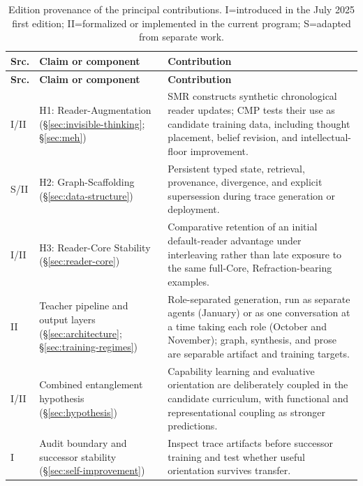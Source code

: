 \documentclass[11pt]{article}
\begin{document}
\begingroup
\small
\setlength{\tabcolsep}{3pt}
\begin{longtable}{
  >{\raggedright\arraybackslash}p{0.85cm}
  >{\raggedright\arraybackslash}p{4.2cm}
  >{\raggedright\arraybackslash}p{8.45cm}}
\caption{Edition provenance of the principal contributions. \textsc{I}=introduced in the July 2025 first edition; \textsc{II}=formalized or implemented in the current program; \textsc{S}=adapted from separate work.}
\label{tab:claim-status}\\
\toprule
\textbf{Src.} & \textbf{Claim or component} & \textbf{Contribution} \\
\midrule
\endfirsthead
\toprule
\textbf{Src.} & \textbf{Claim or component} & \textbf{Contribution} \\
\midrule
\endhead
\bottomrule
\endlastfoot
\textsc{I/II} & H1: Reader-Augmentation (\S\ref{sec:invisible-thinking}; \S\ref{sec:meh}) & SMR constructs synthetic chronological reader updates; CMP tests their use as candidate training data, including thought placement, belief revision, and intellectual-floor improvement. \\
\textsc{S/II} & H2: Graph-Scaffolding (\S\ref{sec:data-structure}) & Persistent typed state, retrieval, provenance, divergence, and explicit supersession during trace generation or deployment. \\
\textsc{I/II} & H3: Reader-Core Stability (\S\ref{sec:reader-core}) & Comparative retention of an initial default-reader advantage under interleaving rather than late exposure to the same full-Core, Refraction-bearing examples. \\
\textsc{II} & Teacher pipeline and output layers (\S\ref{sec:architecture}; \S\ref{sec:training-regimes}) & Role-separated generation, run as separate agents (January) or as one conversation at a time taking each role (October and November); graph, synthesis, and prose are separable artifact and training targets. \\
\textsc{I/II} & Combined entanglement hypothesis (\S\ref{sec:hypothesis}) & Capability learning and evaluative orientation are deliberately coupled in the candidate curriculum, with functional and representational coupling as stronger predictions. \\
\textsc{I} & Audit boundary and successor stability (\S\ref{sec:self-improvement}) & Inspect trace artifacts before successor training and test whether useful orientation survives transfer. \\
\end{longtable}
\endgroup
\end{document}
